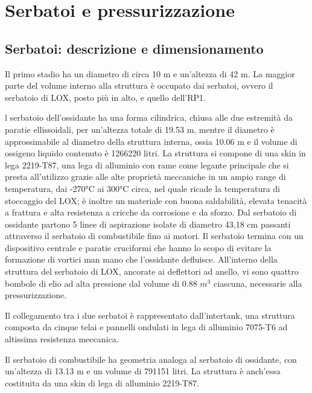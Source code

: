 \section{Serbatoi e pressurizzazione}
\label{sec:serbatoi e pressurizzazione}

\subsection{Serbatoi: descrizione e dimensionamento}
\label{subsec:Serbatoi:descrizione_e_dimensionamento} 


Il primo stadio ha un diametro di circa 10 m e un’altezza di 42 m. La maggior parte del volume interno alla struttura è occupato dai serbatoi, ovvero il serbatoio di LOX, posto più in alto, e quello dell’RP1. 

l serbatoio dell’ossidante ha una forma cilindrica, chiusa alle due estremità da paratie ellissoidali, per un’altezza totale di 19.53 m, mentre il diametro è approssimabile al diametro della struttura interna, ossia 10.06 m e il volume di ossigeno liquido contenuto è 1266220 litri. 
La struttura si compone di una skin in lega 2219-T87, una lega di alluminio con rame come legante principale che si presta all’utilizzo grazie alle alte proprietà meccaniche in un ampio range di temperatura, dai -270°C ai 300°C circa, nel quale ricade la temperatura di stoccaggio del LOX; è inoltre un materiale con buona saldabilità, elevata tenacità a frattura e alta resistenza a cricche da corrosione e da sforzo. 
Dal serbatoio di ossidante partono 5 linee di aspirazione isolate di diametro 43,18 cm passanti attraverso il serbatoio di combustibile fino ai motori. 
Il serbatoio termina con un dispositivo centrale e paratie cruciformi che hanno lo scopo di evitare la formazione di vortici man mano che l’ossidante defluisce.
All’interno della struttura del serbatoio di LOX, ancorate ai deflettori ad anello, vi sono quattro bombole di elio ad alta pressione dal volume di 0.88 $m^3$ ciascuna, necessarie alla pressurizzazione.

Il collegamento tra i due serbatoi è rappresentato dall’intertank, una struttura composta da cinque telai e pannelli ondulati in lega di alluminio 7075-T6 ad altissima resistenza meccanica.

Il serbatoio di combustibile ha geometria analoga al serbatoio di ossidante, con un’altezza di 13.13 m e un volume di 791151 litri. La struttura è anch’essa costituita da una skin di lega di alluminio 2219-T87.

